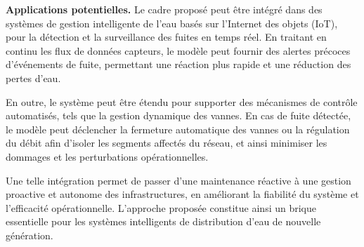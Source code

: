 \vspace{0.2cm}

\noindent \textbf{Applications potentielles.}
Le cadre proposé peut être intégré dans des systèmes de gestion intelligente de
l'eau basés sur l'Internet des objets (IoT), pour la détection et la
surveillance des fuites en temps réel. En traitant en continu les flux de
données capteurs, le modèle peut fournir des alertes précoces d'événements de
fuite, permettant une réaction plus rapide et une réduction des pertes d'eau.

\vspace{0.2cm}

\noindent En outre, le système peut être étendu pour supporter des mécanismes de
contrôle automatisés, tels que la gestion dynamique des vannes. En cas de fuite
détectée, le modèle peut déclencher la fermeture automatique des vannes ou la
régulation du débit afin d'isoler les segments affectés du réseau, et ainsi
minimiser les dommages et les perturbations opérationnelles.

\vspace{0.2cm}

\noindent Une telle intégration permet de passer d'une maintenance réactive à une
gestion proactive et autonome des infrastructures, en améliorant la fiabilité du
système et l'efficacité opérationnelle. L'approche proposée constitue ainsi un
brique essentielle pour les systèmes intelligents de distribution d'eau de
nouvelle génération.